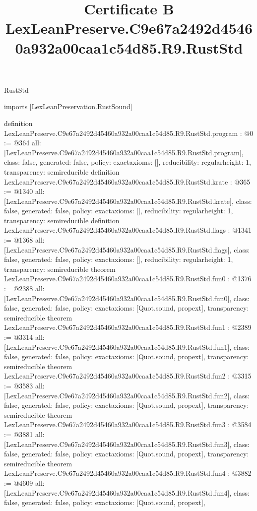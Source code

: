 \begin{lexlean}{RustStd}
\title{Certificate B LexLeanPreserve.C9e67a2492d45460a932a00caa1c54d85.R9.RustStd}
\begin{coremodule}
imports [LexLeanPreservation.RustSound]

definition LexLeanPreserve.C9e67a2492d45460a932a00caa1c54d85.R9.RustStd.program : @0 := @364 {
  all: [LexLeanPreserve.C9e67a2492d45460a932a00caa1c54d85.R9.RustStd.program],
  class: false,
  generated: false,
  policy: exact{axioms: []},
  reducibility: regular{height: 1},
  transparency: semireducible
}
definition LexLeanPreserve.C9e67a2492d45460a932a00caa1c54d85.R9.RustStd.krate : @365 := @1340 {
  all: [LexLeanPreserve.C9e67a2492d45460a932a00caa1c54d85.R9.RustStd.krate],
  class: false,
  generated: false,
  policy: exact{axioms: []},
  reducibility: regular{height: 1},
  transparency: semireducible
}
definition LexLeanPreserve.C9e67a2492d45460a932a00caa1c54d85.R9.RustStd.flags : @1341 := @1368 {
  all: [LexLeanPreserve.C9e67a2492d45460a932a00caa1c54d85.R9.RustStd.flags],
  class: false,
  generated: false,
  policy: exact{axioms: []},
  reducibility: regular{height: 1},
  transparency: semireducible
}
theorem LexLeanPreserve.C9e67a2492d45460a932a00caa1c54d85.R9.RustStd.fun0 : @1376 := @2388 {
  all: [LexLeanPreserve.C9e67a2492d45460a932a00caa1c54d85.R9.RustStd.fun0],
  class: false,
  generated: false,
  policy: exact{axioms: [Quot.sound, propext]},
  transparency: semireducible
}
theorem LexLeanPreserve.C9e67a2492d45460a932a00caa1c54d85.R9.RustStd.fun1 : @2389 := @3314 {
  all: [LexLeanPreserve.C9e67a2492d45460a932a00caa1c54d85.R9.RustStd.fun1],
  class: false,
  generated: false,
  policy: exact{axioms: [Quot.sound, propext]},
  transparency: semireducible
}
theorem LexLeanPreserve.C9e67a2492d45460a932a00caa1c54d85.R9.RustStd.fun2 : @3315 := @3583 {
  all: [LexLeanPreserve.C9e67a2492d45460a932a00caa1c54d85.R9.RustStd.fun2],
  class: false,
  generated: false,
  policy: exact{axioms: [Quot.sound, propext]},
  transparency: semireducible
}
theorem LexLeanPreserve.C9e67a2492d45460a932a00caa1c54d85.R9.RustStd.fun3 : @3584 := @3881 {
  all: [LexLeanPreserve.C9e67a2492d45460a932a00caa1c54d85.R9.RustStd.fun3],
  class: false,
  generated: false,
  policy: exact{axioms: [Quot.sound, propext]},
  transparency: semireducible
}
theorem LexLeanPreserve.C9e67a2492d45460a932a00caa1c54d85.R9.RustStd.fun4 : @3882 := @4609 {
  all: [LexLeanPreserve.C9e67a2492d45460a932a00caa1c54d85.R9.RustStd.fun4],
  class: false,
  generated: false,
  policy: exact{axioms: [Quot.sound, propext]},
}
\end{coremodule}
\end{lexlean}
